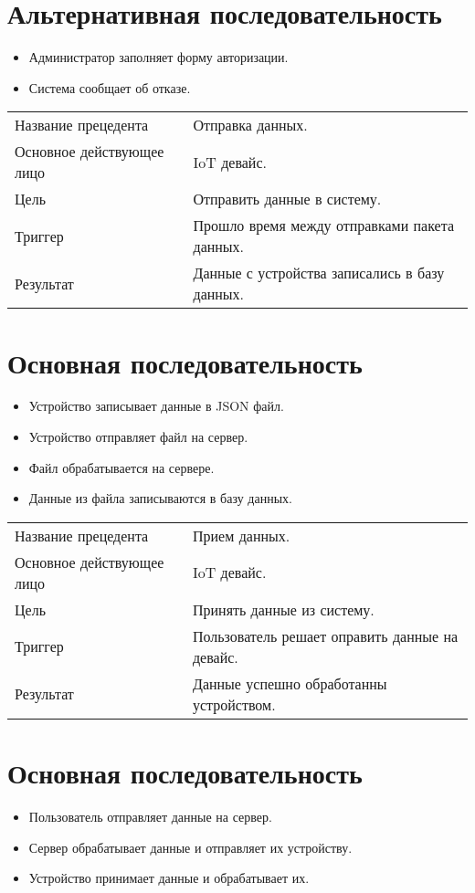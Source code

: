 \section{Альтернативная последовательность}
\begin{itemize}
    \item Администратор заполняет форму авторизации.
    \item Система сообщает об отказе.
\end{itemize}

\begin{table}[]
    \begin{tabular}{ll}
    Название прецедента       & Отправка данных.\\
    Основное действующее лицо & IoT девайс.\\
    Цель                      & Отправить данные в систему.\\
    Триггер                   & Прошло время между отправками пакета данных.\\
    Результат                 & Данные с устройства записались в базу данных. 
    \end{tabular}
\end{table}

\section{Основная последовательность}
\begin{itemize}
    \item Устройство записывает данные в JSON файл.
    \item Устройство отправляет файл на сервер.
    \item Файл обрабатывается на сервере.
    \item Данные из файла записываются в базу данных.
\end{itemize}

\begin{table}[]
    \begin{tabular}{ll}
    Название прецедента       & Прием данных.\\
    Основное действующее лицо & IoT девайс.\\
    Цель                      & Принять данные из систему.\\
    Триггер                   & Пользователь решает оправить данные на девайс.\\
    Результат                 & Данные успешно обработанны устройством. 
    \end{tabular}
\end{table}

\section{Основная последовательность}
\begin{itemize}
    \item Пользователь отправляет данные на сервер.
    \item Сервер обрабатывает данные и отправляет их устройству.
    \item Устройство принимает данные и обрабатывает их.
\end{itemize}

